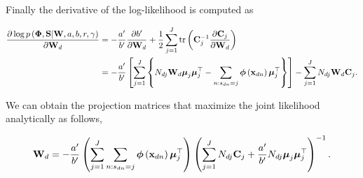 	Finally the derivative of the log-likelihood is computed as
	
	\begin{align}
	\frac{\partial \log p\left(\boldsymbol{\Phi},\mathbf{S}|\mathbf{W},a,b,r,\gamma\right)}{\partial\mathbf{W}_d}  &=  -\frac{a'}{b'}\frac{\partial b'}{\partial\mathbf{W}_d}+\frac{1}{2}\sum_{j=1}^{J} \operatorname{tr}\left(\mathbf{C}_j^{-1}\frac{\partial \mathbf{C}_j}{\partial\mathbf{W}_d}\right) \notag \\
	&=  -\frac{a'}{b'}\left[\sum_{j=1}^{J}\left\{N_{dj}\mathbf{W}_d\boldsymbol{\mu}_j\boldsymbol{\mu}_j^\top - \sum_{n:s_{dn}=j}\boldsymbol{\phi}\left(\mathbf{x}_{dn}\right) \boldsymbol{\mu}_j^\top\right\}\right] -\sum_{j=1}^{J}N_{dj}\mathbf{W}_d\mathbf{C}_j.
	\end{align}
	
	We can obtain the projection matrices that maximize the joint likelihood analytically as follows,
	
	\begin{align}
	\mathbf{W}_d =  -\frac{a'}{b'}\left(\sum_{j=1}^{J}{\sum_{n:s_{dn}=j}\boldsymbol{\phi}\left(\mathbf{x}_{dn}\right) \boldsymbol{\mu}_j^\top}\right)\left(\sum_{j=1}^{J}{N_{dj}\mathbf{C}_j+\frac{a'}{b'}N_{dj}\boldsymbol{\mu}_j\boldsymbol{\mu}_j^\top} \right)^{-1}.
	\end{align}